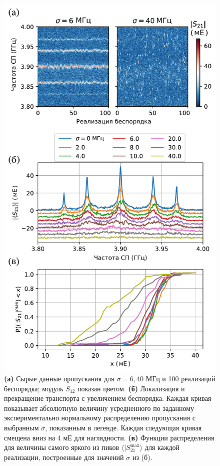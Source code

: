 \documentclass[14pt, a4paper]{extarticle}
\begin{document}
\begin{figure}
	\centering
	\includegraphics[width=0.6\linewidth]{Pictures/mbl}
	\caption{\textbf{(а)} Сырые данные пропускания для $\sigma = 6, 40$ МГц и 100 реализаций беспорядка; модуль $S_{12}$ показан цветом. \textbf{(б)} Локализация и прекращение транспорта с увеличением беспорядка. Каждая кривая показывает абсолютную величину усредненного по заданному экспериментально нормальному распределению пропускания с выбранным $\sigma$, показанным в легенде. Каждая следующая кривая смещена вниз на 4 мЕ для наглядности. \textbf{(в)} Функции распределения для величины самого яркого из пиков $\langle |S_{21}^{\text{max}}\rangle$ для каждой реализации, построенные для значений $\sigma$ из (б).}
	\label{fig:mbl}
\end{figure}
\end{document}
